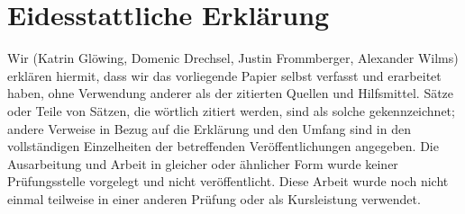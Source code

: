 \section{Eidesstattliche Erklärung}
Wir (Katrin Glöwing, Domenic Drechsel, Justin Frommberger, Alexander Wilms) erklären hiermit, dass wir das vorliegende Papier selbst verfasst und erarbeitet haben, ohne Verwendung anderer als der zitierten Quellen und Hilfsmittel. Sätze oder Teile von Sätzen, die wörtlich zitiert werden, sind als solche gekennzeichnet; andere Verweise in Bezug auf die Erklärung und den Umfang sind in den vollständigen Einzelheiten der betreffenden Veröffentlichungen angegeben. Die Ausarbeitung und Arbeit in gleicher oder ähnlicher Form wurde keiner Prüfungsstelle vorgelegt und nicht veröffentlicht. Diese Arbeit wurde noch nicht einmal teilweise in einer anderen Prüfung oder als Kursleistung verwendet.
